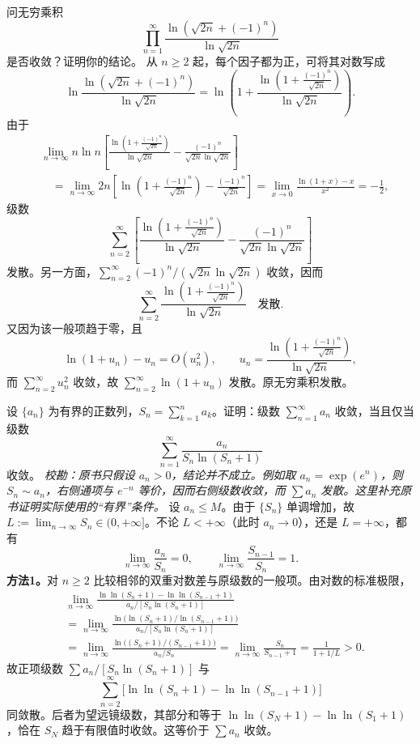 问无穷乘积
\[
\prod_{n=1}^{\infty}\frac{\ln(\sqrt{2n}+(-1)^n)}{\ln\sqrt{2n}}
\]
是否收敛？证明你的结论。
\sol 从 $n\ge2$ 起，每个因子都为正，可将其对数写成
\[
\ln\frac{\ln(\sqrt{2n}+(-1)^n)}{\ln\sqrt{2n}}
=\ln\left(1+
\frac{\ln\left(1+\frac{(-1)^n}{\sqrt{2n}}\right)}{\ln\sqrt{2n}}
\right).
\]
由于
\begin{align*}
&\lim_{n\to\infty} n\ln n\left[
\frac{\ln\left(1+\frac{(-1)^n}{\sqrt{2n}}\right)}{\ln\sqrt{2n}}
-\frac{(-1)^n}{\sqrt{2n}\ln\sqrt{2n}}
\right]\\
&\quad=\lim_{n\to\infty}2n\left[
\ln\left(1+\frac{(-1)^n}{\sqrt{2n}}\right)
-\frac{(-1)^n}{\sqrt{2n}}\right]
=\lim_{x\to0}\frac{\ln(1+x)-x}{x^2}=-\frac12,
\end{align*}
级数
\[
\sum_{n=2}^{\infty}\left[
\frac{\ln\left(1+\frac{(-1)^n}{\sqrt{2n}}\right)}{\ln\sqrt{2n}}
-\frac{(-1)^n}{\sqrt{2n}\ln\sqrt{2n}}
\right]
\]
发散。另一方面，$\sum_{n=2}^{\infty}(-1)^n/(\sqrt{2n}\ln\sqrt{2n})$ 收敛，因而
\[
\sum_{n=2}^{\infty}
\frac{\ln\left(1+\frac{(-1)^n}{\sqrt{2n}}\right)}{\ln\sqrt{2n}}
\quad\text{发散}.
\]
又因为该一般项趋于零，且
\[
\ln(1+u_n)-u_n=O(u_n^2),\qquad
u_n=\frac{\ln\left(1+\frac{(-1)^n}{\sqrt{2n}}\right)}{\ln\sqrt{2n}},
\]
而 $\sum_{n=2}^{\infty}u_n^2$ 收敛，故 $\sum_{n=2}^{\infty}\ln(1+u_n)$ 发散。原无穷乘积发散。

设 $\{a_n\}$ 为有界的正数列，$S_n=\sum_{k=1}^{n}a_k$。证明：级数 $\sum_{n=1}^{\infty}a_n$ 收敛，当且仅当级数
\[
\sum_{n=1}^{\infty}\frac{a_n}{S_n\ln(S_n+1)}
\]
收敛。
\noindent\textit{校勘：原书只假设 $a_n>0$，结论并不成立。例如取 $a_n=\exp(e^n)$，则 $S_n\sim a_n$，右侧通项与 $e^{-n}$ 等价，因而右侧级数收敛，而 $\sum a_n$ 发散。这里补充原书证明实际使用的“有界”条件。}
\pf 设 $a_n\le M$。由于 $\{S_n\}$ 单调增加，故
$L:=\lim_{n\to\infty}S_n\in(0,+\infty]$。不论 $L<+\infty$（此时 $a_n\to0$），还是 $L=+\infty$，都有
\[
\lim_{n\to\infty}\frac{a_n}{S_n}=0,
\qquad
\lim_{n\to\infty}\frac{S_{n-1}}{S_n}=1.
\]
\textbf{方法1。}对 $n\ge2$ 比较相邻的双重对数差与原级数的一般项。由对数的标准极限，
\begin{align*}
&\lim_{n\to\infty}
\frac{\ln\ln(S_n+1)-\ln\ln(S_{n-1}+1)}{a_n/[S_n\ln(S_n+1)]}\\
&=\lim_{n\to\infty}
\frac{\ln\bigl(\ln(S_n+1)/\ln(S_{n-1}+1)\bigr)}{a_n/[S_n\ln(S_n+1)]}\\
&=\lim_{n\to\infty}
\frac{\ln\bigl((S_n+1)/(S_{n-1}+1)\bigr)}{a_n/S_n}
=\lim_{n\to\infty}\frac{S_n}{S_{n-1}+1}
=\frac{1}{1+1/L}>0.
\end{align*}
故正项级数 $\sum a_n/[S_n\ln(S_n+1)]$ 与
\[
\sum_{n=2}^{\infty}\bigl[\ln\ln(S_n+1)-\ln\ln(S_{n-1}+1)\bigr]
\]
同敛散。后者为望远镜级数，其部分和等于
$\ln\ln(S_N+1)-\ln\ln(S_1+1)$，恰在 $S_N$ 趋于有限值时收敛。这等价于 $\sum a_n$ 收敛。

